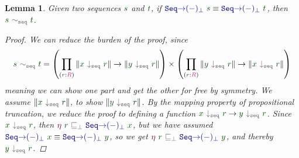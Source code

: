 \documentclass[twoside,11pt,openright]{report}
\theoremstyle{plain} %
\newtheorem{lem}[thm]{Lemma}
\theoremstyle{definition}
\theoremstyle{remark}
\newcommand*{\term}[1]{\textcolor{green!30!black}{#1}} %
\newcommand*{\type}[1]{\textcolor{magenta!90!black}{#1}}
\newcommand*{\relation}[1]{\textcolor{gray!75!black}{\ensuremath{\mathtt{#1}}}}
\newcommand*{\function}[1]{\textcolor{blue!60!black}{\ensuremath{\mathtt{#1}}}}
\newcommand*{\constructor}[1]{\textcolor{purple!60!black}{\ensuremath{\mathtt{#1}}}}
\begin{document}
\begin{lem}
  \label{eq:injectivity-lemma}
  Given two sequences \(\term{s}\) and \(\term{t}\), if \(\function{Seq{\rightarrow}(-)_\bot}~\term{s} \equiv \function{Seq{\rightarrow}(-)_\bot}~\term{t}\), then \(\term{s}~\relation{\sim_{seq}}~\term{t}\).
  \begin{proof}
    We can reduce the burden of the proof, since
    \begin{equation}
      \term{s}~\relation{\sim_{seq}}~\term{t} = \left(\prod_{(\term{r} : \type{R})} \| \term{x}~\relation{\downarrow_{seq}}~\term{r} \| \rightarrow \| \term{y}~\relation{\downarrow_{seq}}~\term{r} \|\right) \times \left(\prod_{(\term{r} : \type{R})} \| \term{y}~\relation{\downarrow_{seq}}~\term{r} \| \rightarrow \| \term{x}~\relation{\downarrow_{seq}}~\term{r} \|\right)
    \end{equation}
    meaning we can show one part and get the other for free by symmetry. We assume \(\| \term{x}~\relation{\downarrow_{seq}}~\term{r} \|\), to show \(\| \term{y}~\relation{\downarrow_{seq}}~\term{r} \|\). By the mapping property of propositional truncation, we reduce the proof to defining a function \(\term{x}~\relation{\downarrow_{seq}}~\term{r} \rightarrow \term{y}~\relation{\downarrow_{seq}}~\term{r}\). Since \(\term{x}~\relation{\downarrow_{seq}}~\term{r}\), then \(\constructor{\eta}~\term{r}~\relation{\sqsubseteq_{\bot}}~\function{Seq{\rightarrow}(-)_\bot}~\term{x}\), but we have assumed \(\function{Seq{\rightarrow}(-)_\bot}~\term{x} \equiv \function{Seq{\rightarrow}(-)_\bot}~\term{y}\), so we get \(\constructor{\eta}~\term{r}~\relation{\sqsubseteq_{\bot}}~\function{Seq{\rightarrow}(-)_\bot}~\term{y}\), and thereby \(\term{y}~\relation{\downarrow_{seq}}~\term{r}\).
  \end{proof}
\end{lem}
\end{document}
